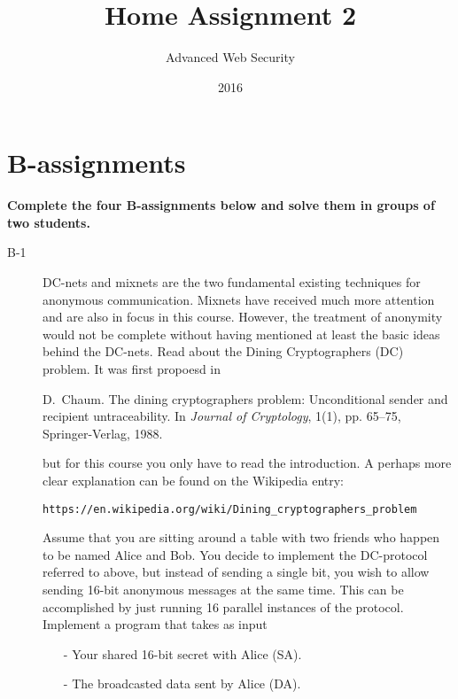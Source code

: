 \documentclass{article}
\begin{document}
\title{Home Assignment 2}
\author{Advanced Web Security}
\date{2016}

\maketitle

\section*{B-assignments}
\textbf{Complete the four B-assignments below and solve them in groups of two students.}

\begin{description}
	\item[B-1]{DC-nets and mixnets are the two fundamental existing techniques for anonymous communication. Mixnets have received much more attention and are also in focus in this course. However, the treatment of anonymity would not be complete without having mentioned at least the basic ideas behind the DC-nets. Read about the Dining Cryptographers (DC) problem. It was first propoesd in
	\begin{center}
		\begin{minipage}{0.8\textwidth}
			D.~Chaum. The dining cryptographers problem: Unconditional sender and recipient untraceability. In \textit{Journal of Cryptology}, 1(1), pp. 65--75, Springer-Verlag, 1988.
		\end{minipage}
	\end{center}
	but for this course you only have to read the introduction. A perhaps more clear explanation can be found on the Wikipedia entry:
	\begin{center}
		\begin{minipage}{0.8\textwidth}
			\verb|https://en.wikipedia.org/wiki/Dining_cryptographers_problem|
		\end{minipage}
	\end{center}
	Assume that you are sitting around a table with two friends who happen to be named Alice and Bob. You decide to implement the DC-protocol referred to above, but instead of sending a single bit, you wish to allow sending 16-bit anonymous messages at the same time. This can be accomplished by just running 16 parallel instances of the protocol. Implement a program that takes as input
	\begin{itemize}
		\item[-] Your shared 16-bit secret with Alice (SA).
		\item[-] The broadcasted data sent by Alice (DA).

\end{itemize}}
\end{description}
\end{document}
